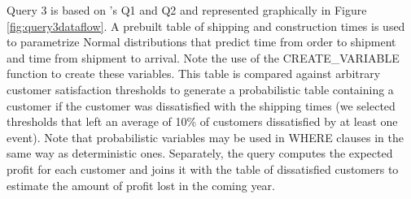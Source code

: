 Query 3 is based on \cite{MCDB}'s Q1 and Q2 and represented graphically in Figure \ref{fig:query3dataflow}.  A prebuilt table of shipping and construction times is used to parametrize Normal distributions that predict time from order to shipment and time from shipment to arrival.  Note the use of the CREATE\_VARIABLE function to create these variables.  This table is compared against arbitrary customer satisfaction thresholds to generate a probabilistic table containing a customer if the customer was dissatisfied with the shipping times (we selected thresholds that left an average of 10\% of customers dissatisfied by at least one event).  Note that probabilistic variables may be used in WHERE clauses in the same way as deterministic ones.  Separately, the query computes the expected profit for each customer and joins it with the table of dissatisfied customers to estimate the amount of profit lost in the coming year.